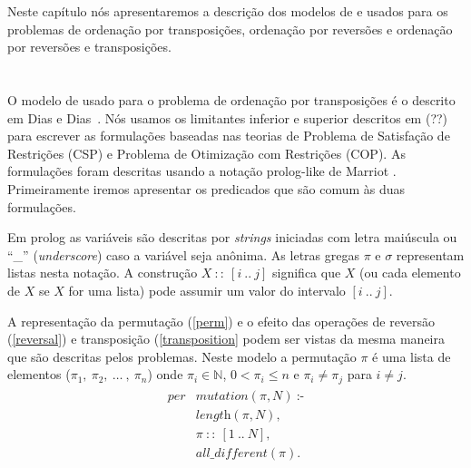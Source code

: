 Neste capítulo nós apresentaremos a descrição dos modelos de \pr{} e
\pli{} usados para os problemas de ordenação por transposições,
ordenação por reversões e ordenação por reversões e transposições.

\section{\PR}
\label{sec:cp}
O modelo de \pr{} usado para o problema de ordenação por transposições
é o descrito em Dias e Dias~\cite{DiasDias*2009}. Nós usamos os
limitantes inferior e superior descritos em (??) para escrever as
formulações baseadas nas teorias de Problema de Satisfação de
Restrições (CSP) e Problema de Otimização com Restrições (COP). As
formulações foram descritas usando a notação prolog-like de
Marriot \cite{Marriott*1998}. Primeiramente iremos apresentar os
predicados que são comum às duas formulações.

Em prolog as variáveis são descritas por \textit{strings} iniciadas
com letra maiúscula ou ``\_'' (\textit{underscore}) caso a variável
seja anônima. As letras gregas $\pi$ e $\sigma$ representam listas
nesta notação. A construção $X~::~[i~..~j]$ significa que $X$ (ou cada
elemento de $X$ se $X$ for uma lista) pode assumir um valor do
intervalo $[i~..~j]$.

A representação da permutação (\ref{perm}) e o efeito das operações de
reversão (\ref{reversal}) e transposição (\ref{transposition} podem
ser vistas da mesma maneira que são descritas pelos problemas. Neste
modelo a permutação $\pi$ é uma lista de elementos
($\pi_{1},~\pi_{2},~\ldots~,~\pi_{n}$) onde $\pi_{i} \in \mathbb{N}$,
$0 < \pi_{i} \le n$ e $\pi_{i} \neq \pi_{j}$ para $i \neq j$.
\begin{align}
  \label{perm}
  \begin{split}
  \textit{per}&\textit{mutation}(\pi, N)~\text{:-} \\
  &\textit{length}(\pi, N), \\ 
  &\pi~::~[1~..~N], \\
  &\textit{all\_different}(\pi). 
  \end{split}
\end{align}

